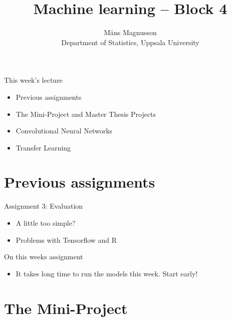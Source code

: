 \documentclass[10pt]{beamer}
\title[]{{\color{black}Machine learning -- Block 4}}
\author[]{M{\aa}ns Magnusson\\Department of Statistics, Uppsala University}
\date{\currentsemester}
\begin{document}
\frame{\titlepage
}



\begin{frame}{This week's lecture}
\begin{itemize}
\item Previous assignments
\item The Mini-Project and Master Thesis Projects
\item Convolutional Neural Networks
\item Transfer Learning
\end{itemize}
\end{frame}




\section{Previous assignments}

\begin{frame}{Assignment 3: Evaluation}

\begin{itemize}
\item A little too simple?
\item Problems with Tensorflow and R
\end{itemize}

\end{frame}

\begin{frame}{On this weeks assignment}
\begin{itemize}
\item It takes long time to run the models this week. Start early!
\end{itemize}
\end{frame}


\section{The Mini-Project}
\end{document}
